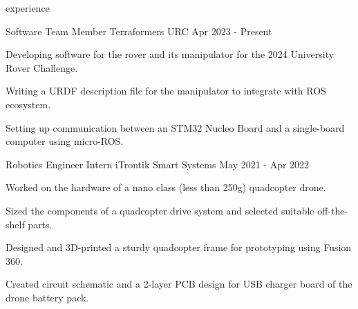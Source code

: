 \begin{section}{experience}

  \begin{work}
    {Software Team Member}
    {Terraformers URC}
    {}
    {Apr 2023 - Present}

    \item Developing software for the rover and its manipulator for the 2024 University Rover Challenge.
    \item Writing a URDF description file for the manipulator to integrate with ROS ecosystem.
    \item Setting up communication between an STM32 Nucleo Board and a single-board computer using micro-ROS.
  
  \end{work}

  \begin{work}
    {Robotics Engineer Intern}
    {iTrontik Smart Systems}
    {}
    {May 2021 - Apr 2022}

    \item Worked on the hardware of a nano class (less than 250g) quadcopter drone.
    \item Sized the components of a quadcopter drive system and selected suitable off-the-shelf parts.
    \item Designed and 3D-printed a sturdy quadcopter frame for prototyping using Fusion 360.
    \item Created circuit schematic and a 2-layer PCB design for USB charger board of the drone battery pack.
  
  \end{work}

\end{section}